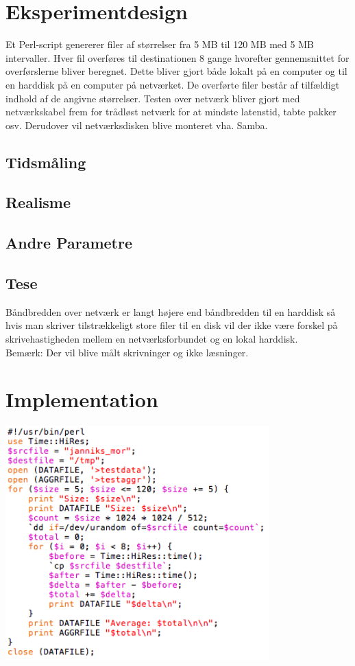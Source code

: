 \documentclass{article}
\author{Mikkel, Jannik, Rune \& Rasmus}
\date{\today}
\begin{document}
\section{Eksperimentdesign}

Et Perl-script genererer filer af størrelser fra 5 MB til 120 MB med 5 MB intervaller. Hver fil overføres til destinationen 8 gange hvorefter gennemsnittet for overførslerne bliver beregnet. Dette bliver gjort både lokalt på en computer og til en harddisk på en computer på netværket. De overførte filer består af tilfældigt indhold af de angivne størrelser. Testen over netværk bliver gjort med netværkskabel frem for trådløst netværk for at mindste latenstid, tabte pakker osv. Derudover vil netværksdisken blive monteret vha. Samba.

\subsection{Tidsmåling}

\subsection{Realisme}


\subsection{Andre Parametre}

\subsection{Tese}
Båndbredden over netværk er langt højere end båndbredden til en harddisk så hvis man skriver tilstrækkeligt store filer til en disk vil der ikke være forskel på skrivehastigheden mellem en netværksforbundet og en lokal harddisk.\\
$$ $$
Bemærk: Der vil blive målt skrivninger og ikke læsninger.

\section{Implementation}

\includegraphics[width=4in]{kode.png}
\end{document}
